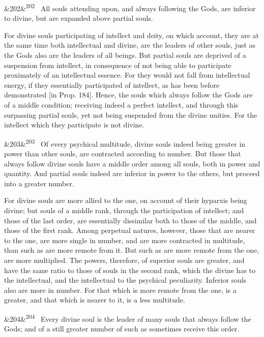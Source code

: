 \documentclass[12pt]{article}
\newcommand{\para}[1][]{\par\noindent\ifx&#1&\else\textsuperscript{\footnotesize #1}~\fi}
\begin{document}
\para[202] All souls attending upon, and always following the Gods, are inferior to divine, but are expanded above partial souls.

For divine souls participating of intellect and deity, on which account, they are at the same time both intellectual and divine, are the leaders of other souls, just as the Gods also are the leaders of all beings. But partial souls are deprived of a suspension from intellect, in consequence of not being able to participate proximately of an intellectual essence. For they would not fall from intellectual energy, if they essentially participated of intellect, as has been before demonstrated [in Prop. 184]. Hence, the souls which always follow the Gods are of a middle condition; receiving indeed a perfect intellect, and through this surpassing partial souls, yet not being suspended from the divine unities. For the intellect which they participate is not divine.

\para[203] Of every psychical multitude, divine souls indeed being greater in power than other souls, are contracted according to number. But those that always follow divine souls have a middle order among all souls, both in power and quantity. And partial souls indeed are inferior in power to the others, but proceed into a greater number.

For divine souls are more allied to the one, on account of their hyparxis being divine; but souls of a middle rank, through the participation of intellect; and those of the last order, are essentially dissimilar both to those of the middle, and those of the first rank. Among perpetual natures, however, those that are nearer to the one, are more single in number, and are more contracted in multitude, than such as are more remote from it. But such as are more remote from the one, are more multiplied. The powers, therefore, of superior souls are greater, and have the same ratio to those of souls in the second rank, which the divine has to the intellectual, and the intellectual to the psychical peculiarity. Inferior souls also are more in number. For that which is more remote from the one, is a greater, and that which is nearer to it, is a less multitude.

\para[204] Every divine soul is the leader of many souls that always follow the Gods; and of a still greater number of such as sometimes receive this order.
\end{document}
